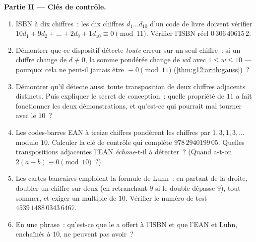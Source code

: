 \begin{problem}
\medskip
\noindent\textbf{Partie II --- Clés de contrôle.}
\begin{enumerate}[resume]
  \item ISBN à dix chiffres~: les dix chiffres $d_1 \dots d_{10}$
        d'un code de livre doivent vérifier
        $10d_1 + 9d_2 + \dots + 2d_9 + 1d_{10} \equiv 0
        \pmod{11}$. Vérifier l'ISBN réel $0\,306\,40615\,2$.
  \item Démontrer que ce dispositif détecte \emph{toute} erreur sur
        un seul chiffre~: si un chiffre change de $d \not\equiv 0$,
        la somme pondérée change de $w d$ avec
        $1 \leq w \leq 10$ --- pourquoi cela ne peut-il jamais être
        $\equiv 0 \pmod{11}$ (\cref{thm:g12:arith:gauss})~?
  \item Démontrer qu'il détecte aussi toute transposition de deux
        chiffres adjacents distincts. Puis expliquer le secret de
        conception~: quelle propriété de $11$ a fait fonctionner les
        deux démonstrations, et qu'est-ce qui pourrait mal tourner
        avec le  $10$~?
  \item Les codes-barres EAN à treize chiffres pondèrent les
        chiffres par $1, 3, 1, 3, \dots$ modulo $10$. Calculer la
        clé de contrôle qui complète $978\,2940199\,05$. Quelles
        transpositions adjacentes l'EAN \emph{échoue}-t-il à
        détecter~? (Quand a-t-on $2(a - b) \equiv 0 \pmod{10}$~?)
  \item Les cartes bancaires emploient la formule de Luhn~: en
        partant de la droite, doubler un chiffre sur deux (en
        retranchant $9$ si le double dépasse $9$), tout sommer, et
        exiger un multiple de $10$. Vérifier le numéro de test
        $4539\,1488\,0343\,6467$.
  \item En une phrase~: qu'est-ce que le   a offert à
        l'ISBN et que l'EAN et Luhn, enchaînés à $10$, ne peuvent
        pas avoir~?
\end{enumerate}


\end{problem}
